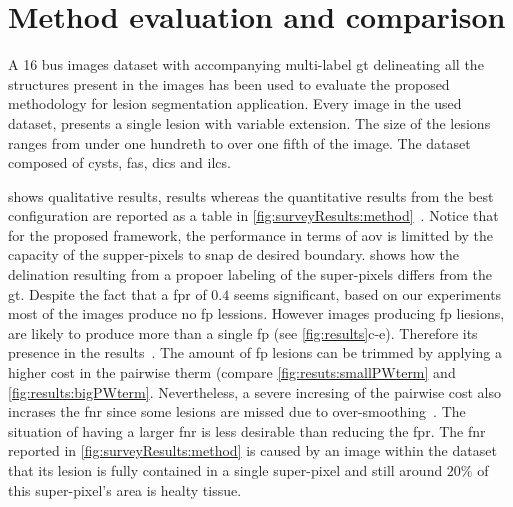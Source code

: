 \graphicspath{ {./content/results/figures/} }



\section{Method evaluation and comparison} 
A 16 \ac{bus} images dataset with accompanying multi-label \ac{gt} delineating all the structures present in the images has been used to evaluate the proposed methodology for lesion segmentation application.
Every image in the used dataset, presents a single lesion with variable extension. 
The size of the lesions ranges from under one hundreth to over one fifth of the image.
The dataset composed of cysts, \acp{fa}, \acp{dic} and \acp{ilc}.

 shows qualitative results, results whereas the quantitative results from the best configuration are reported as a table in \cref{fig:surveyResults:method}~\cite{massich2013phd}.
Notice that for the proposed framework, the performance in terms of \ac{aov} is limitted by the capacity of the supper-pixels to snap de desired boundary.
 shows how the delination resulting from a propoer labeling of the super-pixels differs from the \ac{gt}.
Despite the fact that a \ac{fpr} of $0.4$ seems significant, based on our experiments most of the images produce no \ac{fp} lessions.
However images producing \ac{fp} liesions, are likely to produce more than a single \ac{fp} (see \cref{fig:results}c-e).
Therefore its presence in the results~\cite{massich2013phd}.
The amount of \ac{fp} lesions can be trimmed by applying a higher cost in the pairwise therm (compare \cref{fig:resuts:smallPWterm} and \cref{fig:results:bigPWterm}.
Nevertheless, a severe incresing of the pairwise cost also incrases the \ac{fnr} since some lesions are missed due to over-smoothing~\cite{massich2013phd}.
The situation of having a larger \ac{fnr} is less desirable than reducing the \ac{fpr}. 
The \ac{fnr} reported in \cref{fig:surveyResults:method} is caused by an image within the dataset that its lesion is fully contained in a single super-pixel and still around $20\%$ of this super-pixel's area is healty tissue. 

